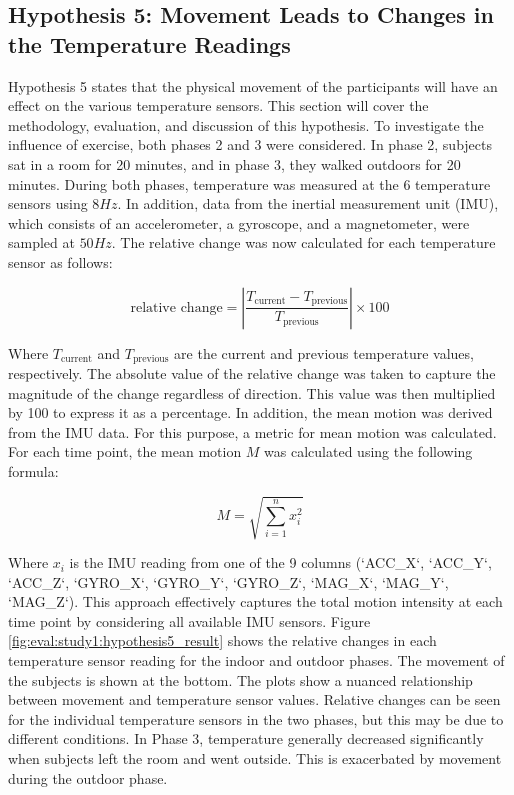 \subsection{Hypothesis 5: Movement Leads to Changes in the Temperature Readings}
\label{subsec:Evaluation:Study1:Hypothesis5}

Hypothesis 5 states that the physical movement of the participants will have an effect on the various temperature sensors. 
This section will cover the methodology, evaluation, and discussion of this hypothesis.
To investigate the influence of exercise, both phases 2 and 3 were considered. 
In phase 2, subjects sat in a room for 20 minutes, and in phase 3, they walked outdoors for 20 minutes.
During both phases, temperature was measured at the 6 temperature sensors using $8 Hz$. 
In addition, data from the inertial measurement unit (IMU), which consists of an accelerometer, a gyroscope, and a magnetometer, were sampled at $50Hz$. 
The relative change was now calculated for each temperature sensor as follows:

\[
\text{relative change} = \left| \frac{{T_{\text{current}} - T_{\text{previous}}}}{{T_{\text{previous}}}} \right| \times 100
\]

Where \( T_{\text{current}} \) and \( T_{\text{previous}} \) are the current and previous temperature values, respectively. 
The absolute value of the relative change was taken to capture the magnitude of the change regardless of direction. 
This value was then multiplied by 100 to express it as a percentage.
In addition, the mean motion was derived from the IMU data.
For this purpose, a metric for mean motion was calculated. 
For each time point, the mean motion \(M\) was calculated using the following formula:

\[
M = \sqrt{{\sum_{i=1}^{n} x_i^2}}
\]

Where \( x_i \) is the IMU reading from one of the 9 columns (`ACC\_X`, `ACC\_Y`, `ACC\_Z`, `GYRO\_X`, `GYRO\_Y`, `GYRO\_Z`, `MAG\_X`, `MAG\_Y`, `MAG\_Z`). This approach effectively captures the total motion intensity at each time point by considering all available IMU sensors.
Figure \ref{fig:eval:study1:hypothesis5_result} shows the relative changes in each temperature sensor reading for the indoor and outdoor phases.
The movement of the subjects is shown at the bottom. 
The plots show a nuanced relationship between movement and temperature sensor values.
Relative changes can be seen for the individual temperature sensors in the two phases, but this may be due to different conditions. 
In Phase 3, temperature generally decreased significantly when subjects left the room and went outside.
This is exacerbated by movement during the outdoor phase. 

